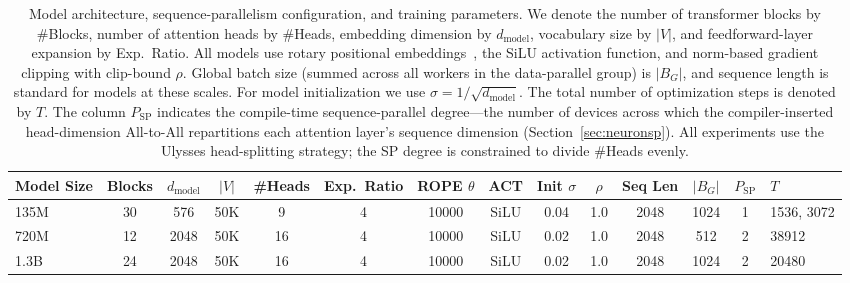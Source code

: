 \documentclass{article}
\begin{document}
\begin{table}[h]
\centering
\caption{Model architecture, sequence-parallelism configuration, and training parameters.
We denote the number of transformer blocks by \#Blocks, number of attention heads by \#Heads,
embedding dimension by $d_{\text{model}}$, vocabulary size by $|V|$, and feedforward-layer
expansion by Exp.\ Ratio.
All models use rotary positional embeddings~\citep{su2024roformer}, the SiLU activation
function, and norm-based gradient clipping with clip-bound $\rho$.
Global batch size (summed across all workers in the data-parallel group) is $|B_G|$, and
sequence length is standard for models at these scales.
For model initialization we use $\sigma = 1/\sqrt{d_{\text{model}}}$.
The total number of optimization steps is denoted by $T$.
The column $P_{\text{SP}}$ indicates the compile-time sequence-parallel degree---the number
of devices across which the compiler-inserted head-dimension All-to-All repartitions each
attention layer's sequence dimension (Section~\ref{sec:neuronsp}).
All experiments use the Ulysses head-splitting strategy; the SP degree is constrained to
divide \#Heads evenly.}
\label{tab:arch}
\begin{tabular}{lcccccccccccc}
\toprule
Model Size & Blocks & $d_{\text{model}}$ & $|V|$ & \#Heads & Exp.\ Ratio & ROPE $\theta$ & ACT & Init $\sigma$ & $\rho$ & Seq Len & $|B_G|$ & $P_{\text{SP}}$ & $T$ \\
\midrule
135M & 30 & 576  & 50K & 9  & 4 & 10000 & SiLU & 0.04 & 1.0 & 2048 & 1024 & 1 & 1536, 3072 \\
720M & 12 & 2048 & 50K & 16 & 4 & 10000 & SiLU & 0.02 & 1.0 & 2048 & 512  & 2 & 38912 \\
1.3B & 24 & 2048 & 50K & 16 & 4 & 10000 & SiLU & 0.02 & 1.0 & 2048 & 1024 & 2 & 20480 \\
\bottomrule
\end{tabular}
\end{table}
\end{document}
